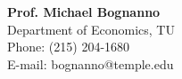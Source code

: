 \documentclass[12pt,letterpaper]{article}
\begin{document}
\begin{multicols}{2}
	
	\vspace{.2in}
	\textbf{Prof. Michael Bognanno} \\
	Department of Economics, TU \\
	\hfill {Phone: (215) 204-1680}\\
	\hfill{E-mail: {\color{blue}bognanno@temple.edu}}\\	
%	
\end{multicols}
\end{document}

